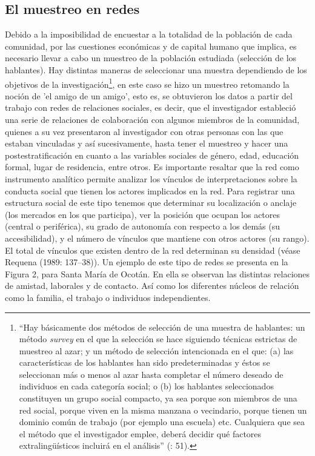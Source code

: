 \documentclass[output=paper]{../langscibook}
\begin{document}
 \subsection{El muestreo en redes}



Debido a la imposibilidad de encuestar a la totalidad de la población de cada comunidad, por las cuestiones económicas y de capital humano que implica, es necesario llevar a cabo un muestreo de la población estudiada (selección de los hablantes). Hay distintas maneras de seleccionar una muestra dependiendo de los objetivos de la investigación\footnote{“Hay básicamente dos métodos de selección de una muestra de hablantes: un método \textit{survey} en el que la selección se hace siguiendo técnicas estrictas de muestreo al azar; y un método de selección intencionada en el que: (a) las características de los hablantes han sido predeterminadas y éstos se seleccionan más o menos al azar hasta completar el número deseado de individuos en cada categoría social; o (b) los hablantes seleccionados constituyen un grupo social compacto, ya sea porque son miembros de una red social, porque viven en la misma manzana o vecindario, porque tienen un dominio común de trabajo (por ejemplo una escuela) etc. Cualquiera que sea el método que el investigador emplee, deberá decidir qué factores extralingüísticos incluirá en el análisis” (\citealt{Silva-CorvalánEnrique-Arias2001}: 51).}, en este caso se hizo un muestreo retomando la noción de 'el amigo de un amigo', esto es, se obtuvieron los datos a partir del trabajo con redes de relaciones sociales, es decir, que el investigador estableció una serie de relaciones de colaboración con algunos miembros de la comunidad, quienes a su vez presentaron al investigador con otras personas con las que estaban vinculadas y así sucesivamente, hasta tener el muestreo y hacer una postestratificación en cuanto a las variables sociales de género, edad, educación formal, lugar de residencia, entre otros. Es importante resaltar que la red como instrumento analítico permite analizar los vínculos de interpretaciones sobre la conducta social que tienen los actores implicados en la red. Para registrar una estructura social de este tipo tenemos que determinar su localización o anclaje (los mercados en los que participa), ver la posición que ocupan los actores (central o periférica), su grado de autonomía con respecto a los demás (su accesibilidad), y el número de vínculos que mantiene con otros actores (su rango). El total de vínculos que existen dentro de la red determinan su densidad (véase Requena  (1989: 137–38)). Un ejemplo de este tipo de redes se presenta en la Figura 2, para Santa María de Ocotán. En ella se observan las distintas relaciones de amistad, laborales y de contacto. Así como los diferentes núcleos de relación como la familia, el trabajo o individuos independientes.
\end{document}
